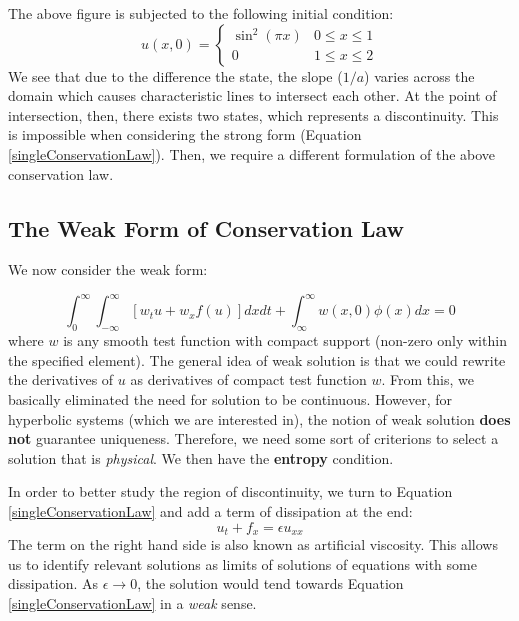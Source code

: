 \documentclass[a4paper]{article}
\numberwithin{equation}{section}
\begin{document}
The above figure is subjected to the following initial condition:
\begin{equation}
    u(x,0) = 
    \begin{cases}
        \sin^2 (\pi x) & 0 \leq x \leq 1 \\
        0 & 1 \leq x \leq 2
    \end{cases}
\end{equation}
We see that due to the difference the state, the slope ($1/a$) varies across the domain which causes characteristic lines to intersect each other. At the point of intersection, then, there exists two states, which represents a discontinuity. This is impossible when considering the strong form (Equation \ref{singleConservationLaw}). Then, we require a different formulation of the above conservation law.
\subsection{The Weak Form of Conservation Law}
We now consider the weak form:

\begin{equation}\label{eq:integralConservationLaw}
    \int_{0}^{\infty} \int_{-\infty}^{\infty} \left[w_t u + w_x f(u) \right] dx dt + \int_{\infty}^\infty w(x,0) \phi(x) dx = 0
\end{equation}
where $w$ is any smooth test function with compact support (non-zero only within the specified element). The general idea of weak solution is that we could rewrite the derivatives of $u$ as derivatives of compact test function $w$. From this, we basically eliminated the need for solution to be continuous. However, for hyperbolic systems (which we are interested in), the notion of weak solution \textbf{does not} guarantee uniqueness. Therefore, we need some sort of criterions to select a solution that is \textit{physical}. We then have the \textbf{entropy} condition. 

In order to better study the region of discontinuity, we turn to Equation \ref{singleConservationLaw} and add a term of dissipation at the end:
\begin{equation} \label{eq:artificial_viscosity}
   u_t + f_x = \epsilon u_{xx}
\end{equation}
The term on the right hand side is also known as artificial viscosity. This allows us to identify relevant solutions as limits of solutions of equations with some dissipation. As $\epsilon \rightarrow 0$, the solution would tend towards Equation \ref{singleConservationLaw} in a \textit{weak} sense. 
\end{document}
